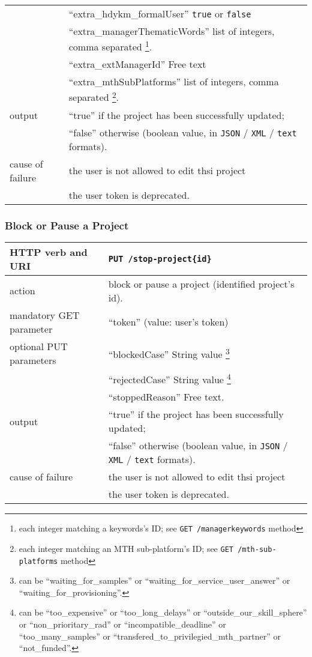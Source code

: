 \begin{tabular}{ | l | l | }
	\space & ``extra\_hdykm\_formalUser'' \texttt{true} or \texttt{false} \\
	\space & ``extra\_managerThematicWords'' list of integers, comma separated \footnote{each integer matching a keywords’s ID; see \texttt{GET /managerkeywords} method}. \\
	\space & ``extra\_extManagerId'' Free text \\
	\space & ``extra\_mthSubPlatforms'' list of integers, comma separated \footnote{each integer matching an MTH sub-platform’s ID; see \texttt{GET /mth-sub-platforms} method}. \\
	\hline
	output & ``true'' if the project has been successfully updated; \\
	\space & ``false'' otherwise (boolean value, in \texttt{JSON} / \texttt{XML} / \texttt{text} formats). \\
	\hline
	cause of failure &the user is not allowed to edit thsi project \\
	\space & the user token is deprecated. \\
	\hline
\end{tabular}
\newline

\subsubsection{Block or Pause a Project}
\begin{tabular}{ | l | l | }
	\hline
	HTTP verb and URI & \texttt{PUT /stop-project\{id\}} \\
	\hline
	action & block or pause a project (identified \via project's id). \\
	\hline
	mandatory GET parameter & ``token'' (value: user's token) \\
	\hline
	optional PUT parameters & ``blockedCase'' String value \footnote{can be ``waiting\_for\_samples'' or ``waiting\_for\_service\_user\_answer'' or ``waiting\_for\_provisioning''.} \\		
	\space & ``rejectedCase'' String value \footnote{can be ``too\_expensive'' or ``too\_long\_delays'' or ``outside\_our\_skill\_sphere'' or ``non\_prioritary\_rad'' or ``incompatible\_deadline'' or ``too\_many\_samples'' or ``transfered\_to\_privilegied\_mth\_partner'' or ``not\_funded''.} \\
	\space & ``stoppedReason'' Free text. \\
	\hline
	output & ``true'' if the project has been successfully updated; \\
	\space & ``false'' otherwise (boolean value, in \texttt{JSON} / \texttt{XML} / \texttt{text} formats). \\
	\hline
	cause of failure &the user is not allowed to edit thsi project \\
	\space & the user token is deprecated. \\
	\hline
\end{tabular}
\newline

